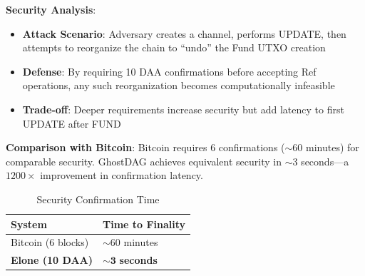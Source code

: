 \textbf{Security Analysis}:
\begin{itemize}
    \item \textbf{Attack Scenario}: Adversary creates a channel, performs UPDATE, then attempts to reorganize the chain to ``undo'' the Fund UTXO creation
    \item \textbf{Defense}: By requiring 10 DAA confirmations before accepting Ref operations, any such reorganization becomes computationally infeasible
    \item \textbf{Trade-off}: Deeper requirements increase security but add latency to first UPDATE after FUND
\end{itemize}

\textbf{Comparison with Bitcoin}:
Bitcoin requires 6 confirmations ($\sim$60 minutes) for comparable security. GhostDAG achieves equivalent security in $\sim$3 seconds---a $1200\times$ improvement in confirmation latency.

\begin{table}[htbp]
\centering
\caption{Security Confirmation Time}
\label{tab:confirm_time}
\small
\begin{tabular}{@{}ll@{}}
\toprule
\textbf{System} & \textbf{Time to Finality} \\
\midrule
Bitcoin (6 blocks) & $\sim 60$ minutes \\
\textbf{Elone (10 DAA)} & $\mathbf{\sim 3}$ \textbf{seconds} \\
\bottomrule
\end{tabular}
\end{table}
